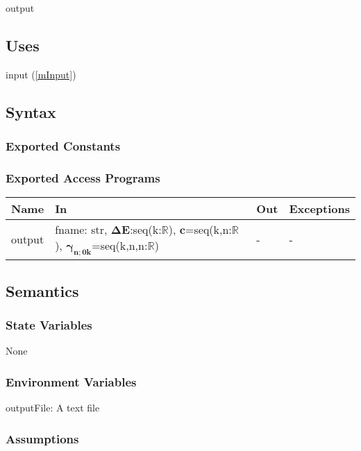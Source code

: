 \documentclass[12pt, titlepage]{article}
\begin{document}
output

\subsection{Uses}
input (\ref{mInput})

\subsection{Syntax}

\subsubsection{Exported Constants}

\subsubsection{Exported Access Programs}

\begin{center}
	\begin{tabular}{p{2cm} p{4cm} p{4cm} p{2cm}}
		\hline
		\textbf{Name} & \textbf{In} & \textbf{Out} & \textbf{Exceptions} \\
		\hline
		output & fname: str, $\boldsymbol{\Delta E}$:seq(k:$\mathbb{R}$), 
		$\boldsymbol{c}$=seq(k,n:$\mathbb{R}$), 
		$\boldsymbol{\gamma_{n;0k}}$=seq(k,n,n:$\mathbb{R}$)& - & - \\
		\hline
	\end{tabular}
\end{center}

\subsection{Semantics}

\subsubsection{State Variables}
None

\subsubsection{Environment Variables}
outputFile: A text file

\subsubsection{Assumptions}
\end{document}
